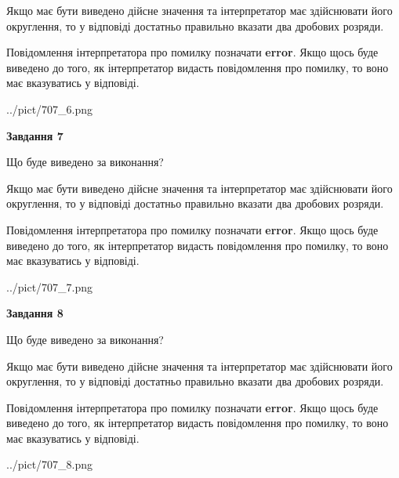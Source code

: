 \documentclass[12pt, ukrainian]{article}
\begin{document}
{\begin {Large}
Якщо має бути виведено дійсне значення та інтерпретатор має здійснювати його округлення, 
то у відповіді достатньо правильно вказати два дробових розряди.

Повідомлення інтерпретатора про помилку позначати \textbf{error}.
Якщо щось буде виведено до того, як інтерпретатор видасть повідомлення про помилку, 
то воно має вказуватись у відповіді. \par

\begin{center}
	{../pict/707_6.png}
\end{center}
\newpage

{\begin {center}\textbf{Завдання 7}\end {center}}\par
Що буде виведено за виконання? \par

Якщо має бути виведено дійсне значення та інтерпретатор має здійснювати його округлення, 
то у відповіді достатньо правильно вказати два дробових розряди.

Повідомлення інтерпретатора про помилку позначати \textbf{error}.
Якщо щось буде виведено до того, як інтерпретатор видасть повідомлення про помилку, 
то воно має вказуватись у відповіді. \par

\begin{center}
	{../pict/707_7.png}
\end{center}
\newpage

{\begin {center}\textbf{Завдання 8}\end {center}}\par
Що буде виведено за виконання? \par

Якщо має бути виведено дійсне значення та інтерпретатор має здійснювати його округлення, 
то у відповіді достатньо правильно вказати два дробових розряди.

Повідомлення інтерпретатора про помилку позначати \textbf{error}.
Якщо щось буде виведено до того, як інтерпретатор видасть повідомлення про помилку, 
то воно має вказуватись у відповіді. \par

\begin{center}
	{../pict/707_8.png}
\end{center}
\newpage


\end{Large}}
\end{document}

